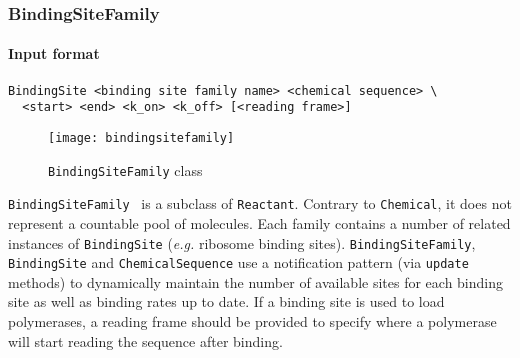 \subsubsection{BindingSiteFamily}

\paragraph{Input format}
\begin{verbatim}
BindingSite <binding site family name> <chemical sequence> \
  <start> <end> <k_on> <k_off> [<reading frame>]
\end{verbatim}

\begin{figure}[!h]
  \centering
  \texttt{[image: bindingsitefamily]}
  \caption{\texttt{BindingSiteFamily} class}
  \label{fig:bsf}
\end{figure}

\texttt{BindingSiteFamily}~ is a subclass of \texttt{Reactant}. Contrary to \texttt{Chemical}, it does not represent a countable pool of molecules. Each family contains a number of related instances of \texttt{BindingSite} (\textit{e.g.} ribosome binding sites). \texttt{BindingSiteFamily}, \texttt{BindingSite} and \texttt{ChemicalSequence} use a notification pattern (via \texttt{update} methods) to dynamically maintain the number of available sites for each binding site as well as binding rates up to date. If a binding site is used to load polymerases, a reading frame should be provided to specify where a polymerase will start reading the sequence after binding.
